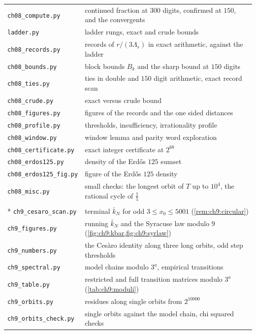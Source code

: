 {\begin{longtable}{@{}l>{\raggedright\arraybackslash}p{}@{}}
\texttt{ch08\_compute.py} & continued fraction at $300$ digits, confirmed at $150$, and the convergents \\
\texttt{ladder.py} & ladder rungs, exact and crude bounds \\
\texttt{ch08\_records.py} & records of $r/(3\Lambda_r)$ in exact arithmetic, against the ladder \\
\texttt{ch08\_bounds.py} & block bounds $B_k$ and the sharp bound at $150$ digits \\
\texttt{ch08\_ties.py} & ties in double and $150$ digit arithmetic, exact record scan \\
\texttt{ch08\_crude.py} & exact versus crude bound \\
\texttt{ch08\_figures.py} & figures of the records and the one sided distances \\
\texttt{ch08\_profile.py} & thresholds, insufficiency, irrationality profile \\
\texttt{ch08\_window.py} & window lemma and parity word exploration \\
\texttt{ch08\_certificate.py} & exact integer certificate at $2^{68}$ \\
\texttt{ch08\_erdos125.py} & density of the Erd\H{o}s $125$ sumset \\
\texttt{ch08\_erdos125\_fig.py} & figure of the Erd\H{o}s $125$ density \\
\texttt{ch08\_misc.py} & small checks: the longest orbit of $T$ up to $10^4$, the rational cycle of $\tfrac15$ \\
\addlinespace[4pt]
\multicolumn{2}{@{}l}{\itshape\Cref{chap:divergence}} \\*
\texttt{ch9\_cesaro\_scan.py} & terminal $\bar k_N$ for odd $3\le x_0\le5001$ (\cref{rem:ch9:circular}) \\
\texttt{ch9\_figures.py} & running $\bar k_N$ and the Syracuse law modulo $9$ (\cref{fig:ch9:kbar,fig:ch9:syrlaw}) \\
\texttt{ch9\_numbers.py} & the Ces\`aro identity along three long orbits, odd step thresholds \\
\texttt{ch9\_spectral.py} & model chains modulo $3^a$, empirical transitions \\
\texttt{ch9\_table.py} & restricted and full transition matrices modulo $3^a$ (\cref{tab:ch9:moduli}) \\
\texttt{ch9\_orbits.py} & residues along single orbits from $2^{10000}$ \\
\texttt{ch9\_orbits\_check.py} & single orbits against the model chain, chi squared checks \\

\end{longtable}}
